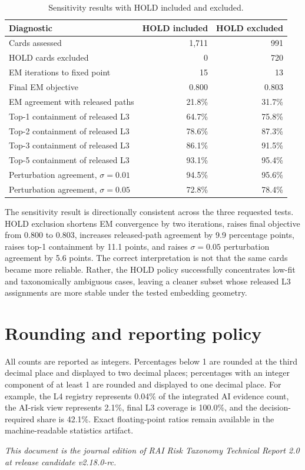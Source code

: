 \documentclass[11pt,a4paper]{article}
\begin{document}
\begin{appendices}
\begin{table}[H]
\centering
\caption{Sensitivity results with HOLD included and excluded.}
\small
\begin{tabular}{lrr}
\toprule
Diagnostic & HOLD included & HOLD excluded \\
\midrule
Cards assessed & 1,711 & 991 \\
HOLD cards excluded & 0 & 720 \\
EM iterations to fixed point & 15 & 13 \\
Final EM objective & 0.800 & 0.803 \\
EM agreement with released paths & 21.8\% & 31.7\% \\
Top-1 containment of released L3 & 64.7\% & 75.8\% \\
Top-2 containment of released L3 & 78.6\% & 87.3\% \\
Top-3 containment of released L3 & 86.1\% & 91.5\% \\
Top-5 containment of released L3 & 93.1\% & 95.4\% \\
Perturbation agreement, $\sigma=0.01$ & 94.5\% & 95.6\% \\
Perturbation agreement, $\sigma=0.05$ & 72.8\% & 78.4\% \\
\bottomrule
\end{tabular}
\end{table}

The sensitivity result is directionally consistent across the three requested
tests. HOLD exclusion shortens EM convergence by two iterations, raises final
objective from 0.800 to 0.803, increases released-path agreement by 9.9
percentage points, raises top-1 containment by 11.1 points, and raises
$\sigma=0.05$ perturbation agreement by 5.6 points. The correct interpretation
is not that the same cards became more reliable. Rather, the HOLD policy
successfully concentrates low-fit and taxonomically ambiguous cases, leaving a
cleaner subset whose released L3 assignments are more stable under the tested
embedding geometry.

\section{Rounding and reporting policy}
\label{app:rounding}

All counts are reported as integers. Percentages below 1 are rounded at the
third decimal place and displayed to two decimal places; percentages with an
integer component of at least 1 are rounded and displayed to one decimal place.
For example, the L4 registry represents 0.04\% of the integrated AI evidence
count, the AI-risk view represents 2.1\%, final L3 coverage is 100.0\%, and the
decision-required share is 42.1\%. Exact floating-point ratios remain available in the
machine-readable statistics artifact.


\end{appendices}


\vspace{6pt}
\noindent\emph{This document is the journal edition of RAI Risk Taxonomy Technical Report 2.0 at release candidate v2.18.0-rc.}
\end{document}
